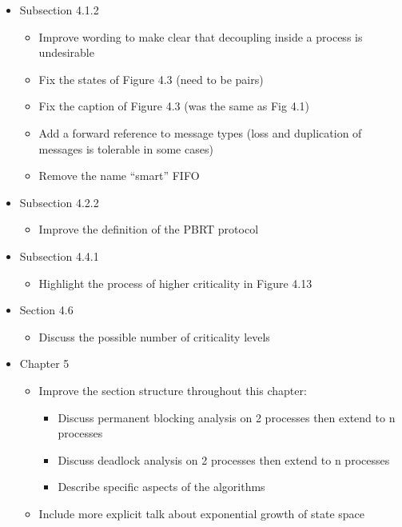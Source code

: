 \documentclass{article}
\begin{document}
\begin{itemize}
\begin{itemize}
        \end{itemize}
    \item Subsection 4.1.2
        \begin{itemize}
            \item Improve wording to make clear that decoupling inside a process is undesirable
            \item Fix the states of Figure 4.3 (need to be pairs)
            \item Fix the caption of Figure 4.3 (was the same as Fig 4.1)
            \item Add a forward reference to message types (loss and duplication of messages is tolerable in some cases)
            \item Remove the name ``smart'' FIFO
        \end{itemize}
    \item Subsection 4.2.2
        \begin{itemize}
            \item Improve the definition of the PBRT protocol
        \end{itemize}
    \item Subsection 4.4.1
        \begin{itemize}
            \item Highlight the process of higher criticality in Figure 4.13
        \end{itemize}
    \item Section 4.6
        \begin{itemize}
            \item Discuss the possible number of criticality levels
        \end{itemize}
    \item Chapter 5
        \begin{itemize}
            \item Improve the section structure throughout this chapter:
                \begin{itemize}
                    \item Discuss permanent blocking analysis on 2 processes then extend to n processes
                    \item Discuss deadlock analysis on 2 processes then extend to n processes
                    \item Describe specific aspects of the algorithms
                \end{itemize}
            \item Include more explicit talk about exponential growth of state space

\end{itemize}
\end{itemize}
\end{document}
